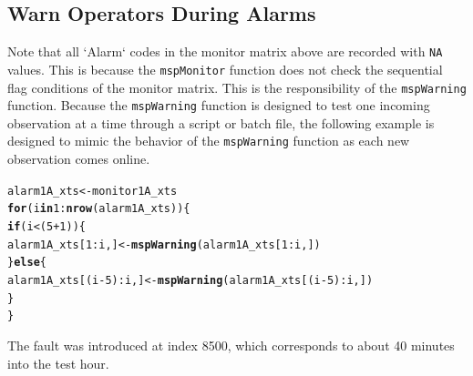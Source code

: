 \documentclass{report}\usepackage[]{graphicx}\usepackage[]{color}
\makeatletter
\newcommand{\hlnum}[1]{\textcolor[rgb]{0.686,0.059,0.569}{#1}}%
\newcommand{\hlopt}[1]{\textcolor[rgb]{0,0,0}{#1}}%
\newcommand{\hlstd}[1]{\textcolor[rgb]{0.345,0.345,0.345}{#1}}%
\newcommand{\hlkwa}[1]{\textcolor[rgb]{0.161,0.373,0.58}{\textbf{#1}}}%
\newcommand{\hlkwb}[1]{\textcolor[rgb]{0.69,0.353,0.396}{#1}}%
\newcommand{\hlkwd}[1]{\textcolor[rgb]{0.737,0.353,0.396}{\textbf{#1}}}%
\newenvironment{kframe}{%
 \def\at@end@of@kframe{}%
 \ifinner\ifhmode%
  \def\at@end@of@kframe{\end{minipage}}%
  \begin{minipage}{\columnwidth}%
 \fi\fi%
 \def\FrameCommand##1{\hskip\@totalleftmargin \hskip-\fboxsep
 \colorbox{shadecolor}{##1}\hskip-\fboxsep
     \hskip-\linewidth \hskip-\@totalleftmargin \hskip\columnwidth}%
 \MakeFramed {\advance\hsize-\width
   \@totalleftmargin\z@ \linewidth\hsize
   \@setminipage}}%
 {\par\unskip\endMakeFramed%
 \at@end@of@kframe}
\newenvironment{knitrout}{}{} %
\makeatother
\begin{document}
\subsection{Warn Operators During Alarms}
Note that all `Alarm` codes in the monitor matrix above are recorded with \texttt{NA} values. This is because the \texttt{mspMonitor} function does not check the sequential flag conditions of the monitor matrix. This is the responsibility of the \texttt{mspWarning} function. Because the \texttt{mspWarning} function is designed to test one incoming observation at a time through a script or batch file, the following example is designed to mimic the behavior of the \texttt{mspWarning} function as each new observation comes online.
\begin{knitrout}
\color{fgcolor}\begin{kframe}
\begin{alltt}
\hlstd{alarm1A_xts} \hlkwb{<-} \hlstd{monitor1A_xts}
\hlkwa{for}\hlstd{(i} \hlkwa{in} \hlnum{1}\hlopt{:}\hlkwd{nrow}\hlstd{(alarm1A_xts))\{}
  \hlkwa{if}\hlstd{(i} \hlopt{<} \hlstd{(}\hlnum{5} \hlopt{+} \hlnum{1}\hlstd{))\{}
    \hlstd{alarm1A_xts[}\hlnum{1}\hlopt{:}\hlstd{i,]} \hlkwb{<-} \hlkwd{mspWarning}\hlstd{(alarm1A_xts[}\hlnum{1}\hlopt{:}\hlstd{i,])}
  \hlstd{\}}\hlkwa{else}\hlstd{\{}
    \hlstd{alarm1A_xts[(i} \hlopt{-} \hlnum{5}\hlstd{)}\hlopt{:}\hlstd{i,]} \hlkwb{<-} \hlkwd{mspWarning}\hlstd{(alarm1A_xts[(i} \hlopt{-} \hlnum{5}\hlstd{)}\hlopt{:}\hlstd{i,])}
  \hlstd{\}}
\hlstd{\}}
\end{alltt}
\end{kframe}
\end{knitrout}
The fault was introduced at index 8500, which corresponds to about 40 minutes into the test hour.
\end{document}
